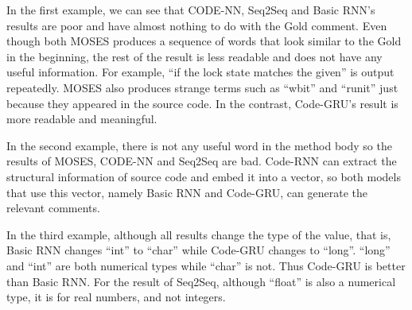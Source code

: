In the first example, we can see that CODE-NN, Seq2Seq and Basic RNN's results are
poor and have almost nothing to do  with the Gold comment.
Even though both MOSES produces a sequence of words that look similar to the Gold
in the beginning, the rest of the result is less readable and does not have
any useful information. For example, ``if the lock state matches the given'' is output
repeatedly. MOSES also produces strange terms such as ``wbit'' and ``runit'' just
because they appeared in the source code.
In the contrast, Code-GRU's result is more readable and meaningful.


In the second example, there is not any useful word in the method body
so the results of MOSES, CODE-NN and Seq2Seq are bad.
Code-RNN can extract the structural information of source code and embed it
into a vector, so both models that use this vector, namely Basic RNN and
Code-GRU, can generate the relevant comments.

In the third example, although all results
change the type of the value, that is, Basic RNN changes ``int'' to ``char''
while Code-GRU changes to ``long''.  ``long'' and ``int'' are both numerical
types while ``char'' is not. Thus Code-GRU is better than Basic RNN.
For the result of Seq2Seq, although ``float'' is also a numerical type,
it is for real numbers, and not integers.

%
%

